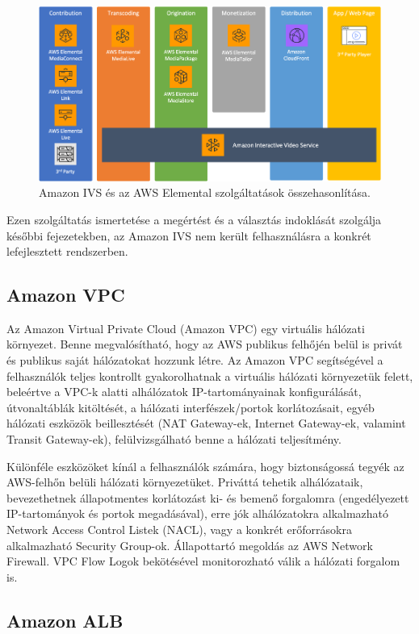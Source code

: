 \begin{figure}[ht]
	\centering
	\includegraphics[width=120mm, keepaspectratio]{figures/aws_media.png}
	\caption{Amazon IVS és az AWS Elemental szolgáltatások összehasonlítása.}
	\label{fig:ivselemental}
\end{figure}

Ezen szolgáltatás ismertetése a megértést és a választás indoklását szolgálja későbbi fejezetekben, az Amazon IVS nem került felhasználásra a konkrét lefejlesztett rendszerben.

\subsection{Amazon VPC}

Az Amazon Virtual Private Cloud (Amazon VPC) egy virtuális hálózati környezet. Benne megvalósítható, hogy az AWS publikus felhőjén belül is privát és publikus saját hálózatokat hozzunk létre. Az Amazon VPC segítségével a felhasználók teljes kontrollt gyakorolhatnak a virtuális hálózati környezetük felett, beleértve a VPC-k alatti alhálózatok IP-tartományainak konfigurálását, útvonaltáblák kitöltését, a hálózati interfészek/portok korlátozásait, egyéb hálózati eszközök beillesztését (NAT Gateway-ek, Internet Gateway-ek, valamint Transit Gateway-ek), felülvizsgálható benne a hálózati teljesítmény.

Különféle eszközöket kínál a felhasználók számára, hogy biztonságossá tegyék az AWS-felhőn belüli hálózati környezetüket. Priváttá tehetik alhálózataik, bevezethetnek állapotmentes korlátozást ki- és bemenő forgalomra (engedélyezett IP-tartományok és portok megadásával), erre jók alhálózatokra alkalmazható Network Access Control Listek (NACL), vagy a konkrét erőforrásokra alkalmazható Security Group-ok. Állapottartó megoldás az AWS Network Firewall. VPC Flow Logok bekötésével monitorozható válik a hálózati forgalom is.

\subsection{Amazon ALB}

